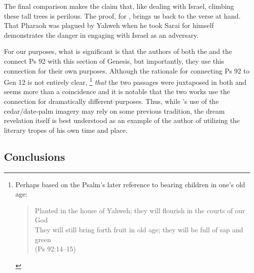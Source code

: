 The final comparison makes the claim that, like dealing with Israel, climbing these tall trees is perilous. The proof, for \GenRabbah, brings us back to the verse at hand. That Pharaoh was plagued by Yahweh when he took Sarai for himself demonstrates the danger in engaging with Israel as an adversary.

For our purposes, what is significant is that the authors of both the \ga and the \GenRabbah connect Ps 92 with this section of Genesis, but importantly, they use this connection for their own purposes. %
Although the rationale for connecting Ps 92 to Gen 12 is not entirely clear,%
%
\footnote{%
\begin{SingleSpace}Perhaps based on the Psalm's later reference to bearing children in one's old age:
\begin{quote}
    Planted in the house of Yahweh; they will flourish in the courts of our God\\
    They will still bring forth fruit in old age; they will be full of sap and green\\
    (Ps 92:14--15)
\end{quote}
\end{SingleSpace}}
%
\emph{that} the two passages were juxtaposed in both \ga and \GenRabbah seems more than a coincidence and it is notable that the two works use the connection for dramatically different purposes. Thus, while \ga's use of the cedar/date-palm imagery may rely on some previous tradition, the dream revelation itself is best understood as an example of the author of \ga utilizing the literary tropes of his own time and place. 



\subsection{Conclusions}

